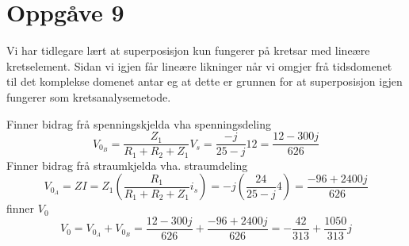 \documentclass[12pt,a4paper]{article}
\begin{document}
  \newpage


  \section*{Oppgåve 9}
    Vi har tidlegare lært at superposisjon kun fungerer på kretsar med lineære kretselement.
    Sidan vi igjen får lineære likninger når vi omgjer frå tidsdomenet til det komplekse
    domenet antar eg at dette er grunnen for at superposisjon igjen fungerer som 
    kretsanalysemetode.

    \bigskip

    Finner bidrag frå spenningskjelda vha spenningsdeling
    \begin{equation}
      V_{0_B} = \frac{Z_1}{R_1 + R_2 + Z_1}V_s = \frac{-j}{25-j}12 = \frac{12-300j}{626}
    \end{equation}
    Finner bidrag frå straumkjelda vha. straumdeling
    \begin{equation}
      V_{0_A} = ZI = Z_1\left( \frac{R_1}{R_1+R_2+Z_1}i_s \right) =
      -j\left(\frac{24}{25-j}4\right) = \frac{-96+2400j}{626}
    \end{equation}
    finner $V_0$
    \begin{equation}
      V_0 = V_{0_A} + V_{0_B} = \frac{12-300j}{626} + \frac{-96+2400j}{626} =
      -\frac{42}{313}+\frac{1050}{313}j
    \end{equation}
\end{document}
